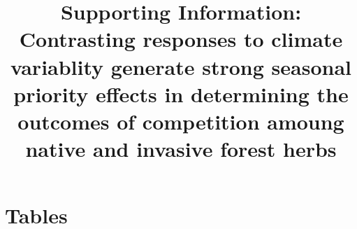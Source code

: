 \documentclass{article}
\title{Supporting Information: Contrasting responses to climate variablity generate strong seasonal priority effects in determining the outcomes of competition amoung native and invasive forest herbs}
\date{}
\begin{document}

\maketitle
\section*{Tables}
\end{document}
